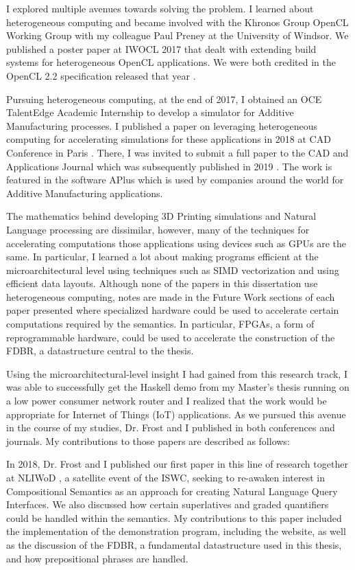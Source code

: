 \documentclass[../main.tex]{subfiles}
\begin{document}
\begin{refsection}
    I explored multiple avenues towards solving the problem.  I learned about heterogeneous computing and became involved with the Khronos Group OpenCL Working Group with my colleague Paul Preney at the University of Windsor.  We published a poster paper at IWOCL 2017 that dealt with extending build systems for heterogeneous OpenCL applications.  We were both credited in the OpenCL 2.2 specification released that year \cite{khronos2018opencl}.

    Pursuing heterogeneous computing, at the end of 2017, I obtained an OCE TalentEdge Academic Internship to develop a simulator for Additive Manufacturing processes.  I published a paper on leveraging heterogeneous computing for accelerating simulations for these applications in 2018 at CAD Conference in Paris \cite{peelar2018toolpath}.  There, I was invited to submit a full paper to the CAD and Applications Journal which was subsequently published in 2019 \cite{peelar2019real}.  The work is featured in the software APlus which is used by companies around the world for Additive Manufacturing applications.

    The mathematics behind developing 3D Printing simulations and Natural Language processing are dissimilar, however, many of the techniques for accelerating computations those applications using devices such as GPUs are the same.  In particular, I learned a lot about making programs efficient at the microarchitectural level using techniques such as SIMD vectorization and using efficient data layouts. Although none of the papers in this dissertation use heterogeneous computing, notes are made in the Future Work sections of each paper presented where specialized hardware could be used to accelerate certain computations required by the semantics.  In particular, FPGAs, a form of reprogrammable hardware, could be used to accelerate the construction of the FDBR, a datastructure central to the thesis.

    Using the microarchitectural-level insight I had gained from this research track, I was able to successfully get the Haskell demo from my Master's thesis running on a low power consumer network router and I realized that the work would be appropriate for Internet of Things (IoT) applications.
    As we pursued this avenue in the course of my studies, Dr. Frost and I published in both conferences and journals.  My contributions to those papers are described as follows:

    In 2018, Dr. Frost and I published our first paper in this line of research together at NLIWoD \cite{frost2018extensible}, a satellite event of the ISWC, seeking to re-awaken interest in Compositional Semantics as an approach for creating Natural Language Query Interfaces.  We also discussed how certain superlatives and graded quantifiers could be handled within the semantics.  My contributions to this paper included the implementation of the demonstration program, including the website, as well as the discussion of the FDBR, a fundamental datastructure used in this thesis, and how prepositional phrases are handled.


\end{refsection}
\end{document}
